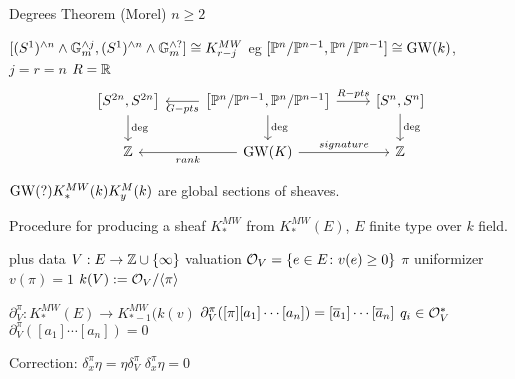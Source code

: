 Degrees Theorem (Morel) $n \geq 2$

$[(S^1)^{\wedge n} \wedge \mathbb{G}_m^{\wedge j}, (S^1)^{\wedge n} \wedge \mathbb{G}_m^{\wedge?}] \cong K^{MW}_{r-j}$
eg $[\mathbb{P}^n/\mathbb{P}^{n-1}, \mathbb{P}^n/\mathbb{P}^{n-1}] \cong \operatorname{GW}(k)$, $j=r=n$
$R= \mathbb{R}$
	\[
	\begin{tikzcd}
	\left[ S^{2n},S^{2n} \right] \arrow{d}{\deg} & \left[\P^n/\P^{n-1},\P^n/\P^{n-1}\right] \arrow{r}{R-pts} \arrow{l}{G-pts} \arrow{d}{\deg} & \left[S^n,S^n\right] \arrow{d}{\deg} \\
	\Z & \gw(K) \arrow{l}{rank} \arrow{r}{signature} & \Z 
	\end{tikzcd}
	\]

$\operatorname{GW}(?) K^{MW}_*(k) K_y^M(k)$ are global sections of sheaves.

Procedure for producing a sheaf
$K^{MW}_*$ from $K^{MW}_*(E)$, $E$ finite type over $k$ field.


plus data
$V: E \to \mathbb{Z} \cup \{\infty\}$ valuation
$\mathcal{O}_V= \{e \in E \colon v(e) \geq 0 \}$
$\pi$ uniformizer $v(\pi)= 1$
$k(V):= \mathcal{O}_V/ \langle \pi \rangle$

$\partial_V^\pi: K^{MW}_*(E) \to K_{*-1}^{MW}(k(v)$
$\partial^\pi_V([\pi][a_1]\cdots[a_n])= [\overline{a}_1]\cdots[\overline{a}_n]$
$q_i \in \mathcal{O}_V^*$ 
$\partial_V^\pi([a_1]\cdots[a_n])=0$



Correction: $\delta_x^\pi \eta= \eta \delta_V^\pi$
$\delta_x^\pi \eta = 0$









































